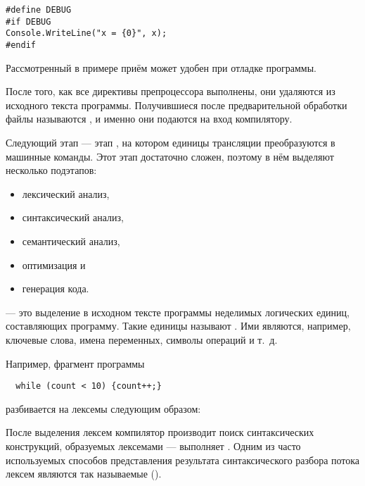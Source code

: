 \begin{lstlisting}
#define DEBUG
#if DEBUG
Console.WriteLine("x = {0}", x);
#endif
\end{lstlisting}

Рассмотренный в примере приём может удобен при отладке программы.

После того, как все директивы препроцессора выполнены, они удаляются
из исходного текста программы. Получившиеся после предварительной
обработки файлы называются , и именно они подаются на вход компилятору.

Следующий этап — этап , на котором
единицы трансляции преобразуются в машинные команды. Этот этап
достаточно сложен, поэтому в нём выделяют несколько подэтапов:

\begin{itemize}
\item лексический анализ,
\item синтаксический анализ,
\item семантический анализ,
\item оптимизация и
\item генерация кода.
\end{itemize}

 — это выделение в
исходном тексте программы неделимых логических единиц, составляющих
программу. Такие единицы называют . Ими
являются, например, ключевые слова, имена переменных, символы операций
и т.~д.

Например, фрагмент программы
\begin{lstlisting}
  while (count < 10) {count++;}
\end{lstlisting}
разбивается на лексемы следующим образом:


После выделения лексем компилятор производит поиск синтаксических
конструкций, образуемых лексемами — выполняет
. Одним из часто
используемых способов представления результата синтаксического разбора
потока лексем являются так называемые 
().

